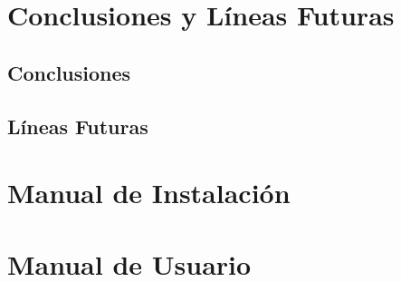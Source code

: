 \documentclass[12pt, a4paper, twoside]{article}
\begin{document}
\section{Conclusiones y Líneas Futuras}
\subsection{Conclusiones}

\newpage\cleardoublepage

\subsection{Líneas Futuras}

\newpage\cleardoublepage

{}

\newpage\cleardoublepage

\begin{umaappendices}
  \section{Manual de Instalación}
  
  
  \section{Manual de Usuario}
  

\end{umaappendices}



\end{document}

